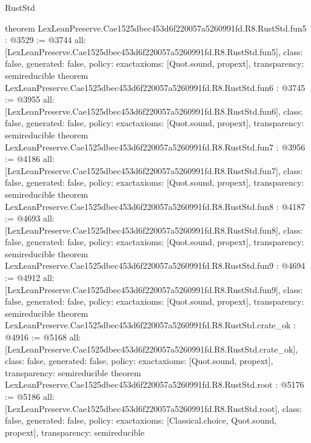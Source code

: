 \begin{lexlean}{RustStd}
\begin{coremodule}
{}
theorem LexLeanPreserve.Cae1525dbec453d6f220057a5260991fd.R8.RustStd.fun5 : @3529 := @3744 {
  all: [LexLeanPreserve.Cae1525dbec453d6f220057a5260991fd.R8.RustStd.fun5],
  class: false,
  generated: false,
  policy: exact{axioms: [Quot.sound, propext]},
  transparency: semireducible
}
theorem LexLeanPreserve.Cae1525dbec453d6f220057a5260991fd.R8.RustStd.fun6 : @3745 := @3955 {
  all: [LexLeanPreserve.Cae1525dbec453d6f220057a5260991fd.R8.RustStd.fun6],
  class: false,
  generated: false,
  policy: exact{axioms: [Quot.sound, propext]},
  transparency: semireducible
}
theorem LexLeanPreserve.Cae1525dbec453d6f220057a5260991fd.R8.RustStd.fun7 : @3956 := @4186 {
  all: [LexLeanPreserve.Cae1525dbec453d6f220057a5260991fd.R8.RustStd.fun7],
  class: false,
  generated: false,
  policy: exact{axioms: [Quot.sound, propext]},
  transparency: semireducible
}
theorem LexLeanPreserve.Cae1525dbec453d6f220057a5260991fd.R8.RustStd.fun8 : @4187 := @4693 {
  all: [LexLeanPreserve.Cae1525dbec453d6f220057a5260991fd.R8.RustStd.fun8],
  class: false,
  generated: false,
  policy: exact{axioms: [Quot.sound, propext]},
  transparency: semireducible
}
theorem LexLeanPreserve.Cae1525dbec453d6f220057a5260991fd.R8.RustStd.fun9 : @4694 := @4912 {
  all: [LexLeanPreserve.Cae1525dbec453d6f220057a5260991fd.R8.RustStd.fun9],
  class: false,
  generated: false,
  policy: exact{axioms: [Quot.sound, propext]},
  transparency: semireducible
}
theorem LexLeanPreserve.Cae1525dbec453d6f220057a5260991fd.R8.RustStd.crate_ok : @4916 := @5168 {
  all: [LexLeanPreserve.Cae1525dbec453d6f220057a5260991fd.R8.RustStd.crate_ok],
  class: false,
  generated: false,
  policy: exact{axioms: [Quot.sound, propext]},
  transparency: semireducible
}
theorem LexLeanPreserve.Cae1525dbec453d6f220057a5260991fd.R8.RustStd.root : @5176 := @5186 {
  all: [LexLeanPreserve.Cae1525dbec453d6f220057a5260991fd.R8.RustStd.root],
  class: false,
  generated: false,
  policy: exact{axioms: [Classical.choice, Quot.sound, propext]},
  transparency: semireducible
}


\end{coremodule}
\end{lexlean}
